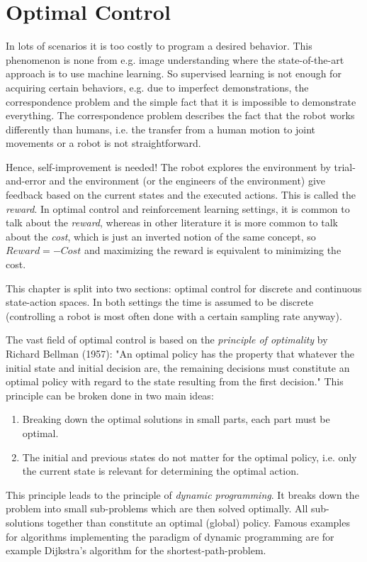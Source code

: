 \chapter{Optimal Control}
	In lots of scenarios it is too costly to program a desired behavior. This phenomenon is none from e.g. image understanding where the state-of-the-art approach is to use machine learning. So supervised learning is not enough for acquiring certain behaviors, e.g. due to imperfect demonstrations, the correspondence problem and the simple fact that it is impossible to demonstrate everything. The correspondence problem describes the fact that the robot works differently than humans, i.e. the transfer from a human motion to joint movements or a robot is not straightforward.

	Hence, self-improvement is needed! The robot explores the environment by trial-and-error and the environment (or the engineers of the environment) give feedback based on the current states and the executed actions. This is called the \emph{reward}. In optimal control and reinforcement learning settings, it is common to talk about the \emph{reward}, whereas in other literature it is more common to talk about the \emph{cost}, which is just an inverted notion of the same concept, so \( \mathit{Reward} = -\mathit{Cost} \) and maximizing the reward is equivalent to minimizing the cost.

	This chapter is split into two sections: optimal control for discrete and continuous state-action spaces. In both settings the time is assumed to be discrete (controlling a robot is most often done with a certain sampling rate anyway).

	The vast field of optimal control is based on the \emph{principle of optimality} by Richard Bellman (1957): "An optimal policy has the property that whatever the initial state and initial decision are, the remaining decisions must constitute an optimal policy with regard to the state resulting from the first decision." This principle can be broken done in two main ideas:
	\begin{enumerate}
		\item Breaking down the optimal solutions in small parts, each part must be optimal.
		\item The initial and previous states do not matter for the optimal policy, i.e. only the current state is relevant for determining the optimal action.
	\end{enumerate}
	This principle leads to the principle of \emph{dynamic programming}. It breaks down the problem into small sub-problems which are then solved optimally. All sub-solutions together than constitute an optimal (global) policy. Famous examples for algorithms implementing the paradigm of dynamic programming are for example Dijkstra's algorithm for the shortest-path-problem.

